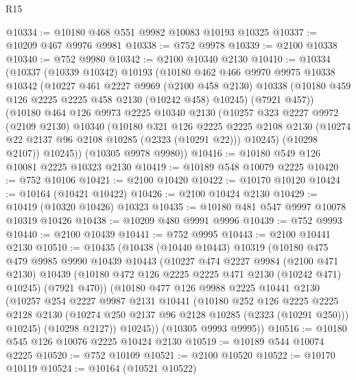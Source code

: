 \begin{lexlean}{R15}
\begin{coremodule}
@10334 := @10180 @468 @551 @9982 @10083 @10193 @10325
@10337 := @10209 @467 @9976 @9981
@10338 := @752 @9978
@10339 := @2100 @10338
@10340 := @752 @9980
@10342 := @2100 @10340 @2130
@10410 := @10334
    (@10337
      (@10339 @10342)
      @10193
      (@10180
        @462
        @466
        @9970
        @9975
        @10338
        @10342
        (@10227
          @461
          @2227
          @9969
          (@2100 @458 @2130)
          @10338
          (@10180 @459 @126 @2225 @2225 @458 @2130 (@10242 @458) @10245)
          (@7921 @457))
        (@10180
          @464
          @126
          @9973
          @2225
          @10340
          @2130
          (@10257
            @323
            @2227
            @9972
            (@2109 @2130)
            @10340
            (@10180
              @321
              @126
              @2225
              @2225
              @2108
              @2130
              (@10274 @22 @2137 @96 @2108 @10285 (@2323 (@10291 @22)))
              @10245)
            (@10298 @2107))
          @10245))
      (@10305 @9978 @9980))
@10416 := @10180 @549 @126 @10081 @2225 @10323 @2130
@10419 := @10189 @548 @10079 @2225
@10420 := @752 @10106
@10421 := @2100 @10420
@10422 := @10170 @10120
@10424 := @10164 (@10421 @10422)
@10426 := @2100 @10424 @2130
@10429 := @10419 (@10320 @10426) @10323
@10435 := @10180 @481 @547 @9997 @10078 @10319 @10426
@10438 := @10209 @480 @9991 @9996
@10439 := @752 @9993
@10440 := @2100 @10439
@10441 := @752 @9995
@10443 := @2100 @10441 @2130
@10510 := @10435
    (@10438
      (@10440 @10443)
      @10319
      (@10180
        @475
        @479
        @9985
        @9990
        @10439
        @10443
        (@10227
          @474
          @2227
          @9984
          (@2100 @471 @2130)
          @10439
          (@10180 @472 @126 @2225 @2225 @471 @2130 (@10242 @471) @10245)
          (@7921 @470))
        (@10180
          @477
          @126
          @9988
          @2225
          @10441
          @2130
          (@10257
            @254
            @2227
            @9987
            @2131
            @10441
            (@10180
              @252
              @126
              @2225
              @2225
              @2128
              @2130
              (@10274 @250 @2137 @96 @2128 @10285 (@2323 (@10291 @250)))
              @10245)
            (@10298 @2127))
          @10245))
      (@10305 @9993 @9995))
@10516 := @10180 @545 @126 @10076 @2225 @10424 @2130
@10519 := @10189 @544 @10074 @2225
@10520 := @752 @10109
@10521 := @2100 @10520
@10522 := @10170 @10119
@10524 := @10164 (@10521 @10522)

\end{coremodule}
\end{lexlean}
